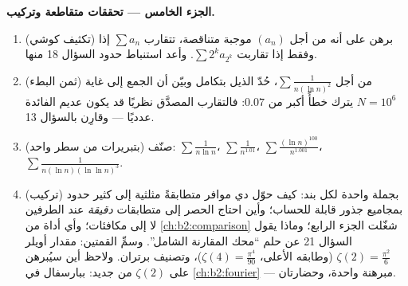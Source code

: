\begin{problem}[{مسألة نهاية الأسبوع --- $\zeta(2) = \pi^2/6$ وبانوراما
برتران}]
\medskip
\noindent\textbf{الجزء الخامس --- تحققات متقاطعة وتركيب.}
\begin{enumerate}[resume]
  \item (تكثيف كوشي) برهن على أنه من أجل $(a_n)$ موجبة
        متناقصة، تتقارب $\sum a_n$ إذا وفقط إذا تقاربت $\sum 2^k a_{2^k}$. وأعد استنباط حدود السؤال 18 منها.
  \item (ثمن البطء) من أجل $\sum\frac1{n(\ln n)^2}$،
        حُدّ الذيل بتكامل وبيّن أن الجمع إلى غاية
        $N = 10^6$ يترك خطأً أكبر من
        $0.07$: فالتقارب المصدَّق نظريًا قد يكون عديم الفائدة
        عدديًا --- وقارِن بالسؤال 13.
  \item صنّف (بتبريرات من سطر واحد):
        $\sum\frac1{n\ln n}$، $\sum\frac1{n^{1.01}}$،
        $\sum\frac{(\ln n)^{100}}{n^{1.001}}$،
        $\sum\frac1{n(\ln n)(\ln\ln n)^{3}}$.
  \item (تركيب) بجملة واحدة لكل بند: كيف حوّل دي موافر
        متطابقةً مثلثية إلى كثير حدود بمجاميع جذور قابلة
        للحساب؛ وأين احتاج الحصر إلى متطابقات
        \emph{دقيقة} عند الطرفين لا إلى مكافئات؛ وأي أداة
        من \cref{ch:b2:comparison} شغّلت الجزء الرابع؛ وماذا
        يقول السؤال 21 عن حلم ``محك المقارنة
        الشامل''. وسمِّ القمتين: مقدار أويلر
        $\zeta(2) = \frac{\pi^2}6$ (وطابقه الأعلى،
        $\zeta(4) = \frac{\pi^4}{90}$)، وتصنيف برتران.
        ولاحظ أين سيُبرهن على $\zeta(2)$ من جديد:
        ببارسفال في \cref{ch:b2:fourier} --- مبرهنة
        واحدة، وحضارتان.
\end{enumerate}
\end{problem}
